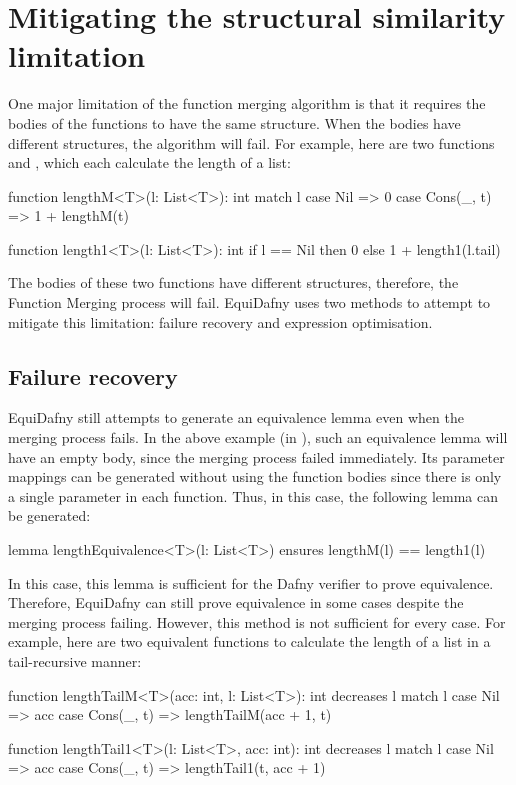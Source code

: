 \section{Mitigating the structural similarity limitation}\label{sec:structural-similarity-limitation}

One major limitation of the function merging algorithm is that it requires the bodies of the functions to have the same structure. When the bodies have different structures, the algorithm will fail. For example, here are two functions  and , which each calculate the length of a list:
\begin{dafny}
function lengthM<T>(l: List<T>): int {
    match l {
        case Nil => 0
        case Cons(_, t) => 1 + lengthM(t)
    }
}

function length1<T>(l: List<T>): int {
    if l == Nil then 0 else 1 + length1(l.tail)
}
\end{dafny}
%

The bodies of these two functions have different structures, therefore, the Function Merging process will fail. EquiDafny uses two methods to attempt to mitigate this limitation: failure recovery and expression optimisation. 

\subsection{Failure recovery}\label{sec:failure-recovery}

EquiDafny still attempts to generate an equivalence lemma even when the merging process fails. In the above example (in ), such an equivalence lemma will have an empty body, since the merging process failed immediately. Its parameter mappings can be generated without using the function bodies since there is only a single parameter in each function. Thus, in this case, the following lemma can be generated:

\begin{dafny}
lemma lengthEquivalence<T>(l: List<T>)
    ensures lengthM(l) == length1(l)
{}
\end{dafny}
%
In this case, this lemma is sufficient for the Dafny verifier to prove equivalence. Therefore, EquiDafny can still prove equivalence in some cases despite the merging process failing. However, this method is not sufficient for every case. For example, here are two equivalent functions to calculate the length of a list in a tail-recursive manner:
\begin{dafny}
function lengthTailM<T>(acc: int, l: List<T>): int
    decreases l
{
    match l {
        case Nil => acc
        case Cons(_, t) => lengthTailM(acc + 1, t)
    }
}

function lengthTail1<T>(l: List<T>, acc: int): int
    decreases l
{
    match l {
        case Nil => acc
        case Cons(_, t) => lengthTail1(t, acc + 1)
    }
}
\end{dafny}
%

